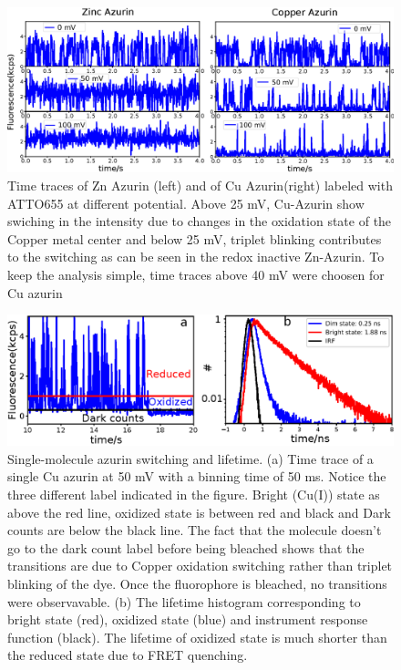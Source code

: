 \documentclass[11pt,a4paper,onecolumn]{article}
\begin{document}
\begin{figure}
  \centering
  \includegraphics[width=\textwidth,keepaspectratio]{SI_timetrace_Zn_Cu.eps}
  \makeatletter
  \renewcommand{\fnum@figure}{\figurename~S\thefigure}
  \makeatother
  \caption{Time traces of Zn Azurin (left) and of Cu Azurin(right) labeled with ATTO655 at different potential.  Above 25 mV, Cu-Azurin show swiching in the intensity due to changes in the oxidation state of the Copper metal center and below 25 mV, triplet blinking contributes to the switching as can be seen in the redox inactive Zn-Azurin. To keep the analysis simple, time traces above 40 mV were choosen for Cu azurin}
  \label{SIfig:tracecomparision}
\end{figure}
\begin{figure}
  \centering
  \includegraphics{lifetime.eps}
  \makeatletter
  \renewcommand{\fnum@figure}{\figurename~S\thefigure
}  \makeatother
  \caption{Single-molecule azurin switching and lifetime. (a) Time trace of a single Cu azurin at 50 mV with a binning time of 50 ms. Notice the three different label indicated in the figure. Bright (Cu(I)) state as above the red line, oxidized state is between red and black and Dark counts are below the black line. The fact that the molecule doesn't go to the dark count label before being bleached shows that the transitions are due to Copper oxidation switching rather than triplet blinking of the dye. Once the fluorophore is bleached, no transitions were observavable. (b) The lifetime histogram corresponding to bright state (red), oxidized state (blue) and instrument response function (black). The lifetime of oxidized state is much shorter than the reduced state due to FRET quenching.}
  \label{SIfig: lifetime}
\end{figure}
\end{document}
